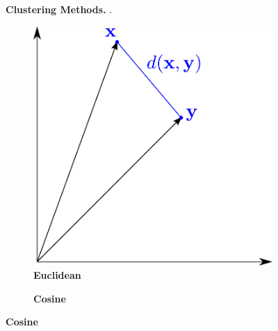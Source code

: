 \begin{figure}
\begin{subfigure}[b]{0.475\textwidth}
    \end{subfigure}
    \caption[Clustering Methods]{\textbf{Clustering Methods.} .}
    \label{fig:Methods}
\end{figure}

\blindtext

\begin{figure}
    \centering
    \begin{subfigure}[b]{0.475\textwidth}
        \caption[Euclidean]{\textbf{Euclidean}}
        \label{subfig:Euclidean}
        \includegraphics[width=\textwidth]{Graphics/Euclidean.pdf}
    \end{subfigure}
    \hfill
    \begin{subfigure}[b]{0.475\textwidth}
        \caption[Cosine]{\textbf{Cosine}}
        \label{subfig:Cosinus}            

\end{subfigure}
\end{figure}
